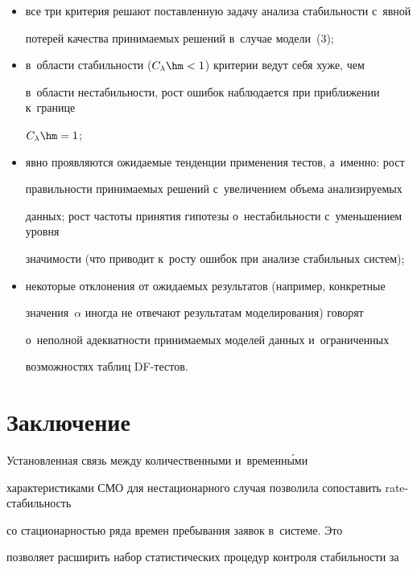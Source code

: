     \begin{itemize}


\item все три критерия решают по\-став\-лен\-ную задачу анализа ста\-биль\-ности с~явной 


потерей качества при\-ни\-ма\-емых решений в~случае модели~(3);


\item в~области ста\-биль\-ности ($C_\lambda\hm<1$) критерии ведут себя хуже, чем 


в~об\-ласти нестабильности, рост ошибок наблюдается при при\-бли\-же\-нии к~границе 


$C_\lambda\hm=1$;


\item явно проявляются ожидаемые тенденции применения тестов, а~именно: рост 


пра\-виль\-ности при\-ни\-ма\-емых решений с~увеличением объема ана\-ли\-зи\-ру\-емых 


данных; рост частоты принятия гипотезы о~не\-ста\-биль\-ности с~уменьшением уровня 


значимости (что приводит к~росту ошибок при анализе стабильных сис\-тем);


\item некоторые отклонения от ожи\-да\-емых результатов (например, конкретные 


значения~$\alpha$ иногда не отвечают результатам моделирования) говорят 


о~неполной адекват\-ности при\-ни\-ма\-емых моделей данных и~ограниченных 


возможностях таб\-лиц DF-тес\-тов.


\end{itemize}





\section{Заключение}





     Установленная связь между количественными и~временн\'{ы}ми 


характеристиками СМО для нестационарного случая поз\-во\-ли\-ла со\-по\-ста\-вить rate-ста\-биль\-ность 


со ста\-ци\-о\-нар\-ностью ряда времен пребывания заявок в~сис\-те\-ме. Это 


позволяет расширить набор статистических процедур контроля ста\-биль\-ности за 


